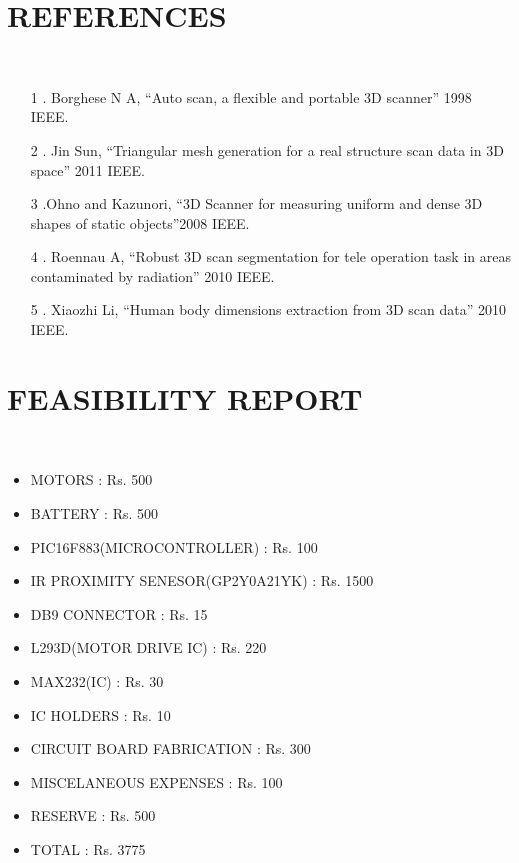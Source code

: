 \documentclass[12pt,a4paper,oneside]{report}
\begin{document}
\begin{onehalfspacing}
\section{REFERENCES}
{$\;\;\;\;$}
\begin{enumerate}	
\item [1]. Borghese N A, “Auto scan, a flexible and portable 3D scanner” 1998  IEEE.
\item [2]. Jin Sun, “Triangular mesh generation for a real structure scan data in 3D space” 2011 IEEE.
\item [3].Ohno and Kazunori, “3D Scanner for measuring uniform and dense 3D shapes of static objects”2008 IEEE.
\item [4]. Roennau A, “Robust 3D scan segmentation for tele operation task in areas contaminated by radiation” 2010 IEEE.
\item [5]. Xiaozhi Li, “Human body dimensions extraction from 3D scan data” 2010 IEEE.
\end{enumerate}


\section{FEASIBILITY REPORT}
{$\;\;\;\;$}	
\begin{itemize}
\item MOTORS                             : Rs. 500
\item BATTERY                            : Rs. 500
\item PIC16F883(MICROCONTROLLER)         : Rs. 100
\item IR PROXIMITY SENESOR(GP2Y0A21YK)   : Rs. 1500
\item DB9 CONNECTOR                      : Rs. 15
\item L293D(MOTOR DRIVE IC)              : Rs. 220
\item MAX232(IC)                         : Rs. 30
\item IC HOLDERS                         : Rs. 10
\item CIRCUIT BOARD FABRICATION          : Rs. 300
\item MISCELANEOUS EXPENSES              : Rs. 100
\item RESERVE                            : Rs. 500
\item TOTAL                              : Rs. 3775
\end{itemize}

\end{onehalfspacing}
\end{document}
